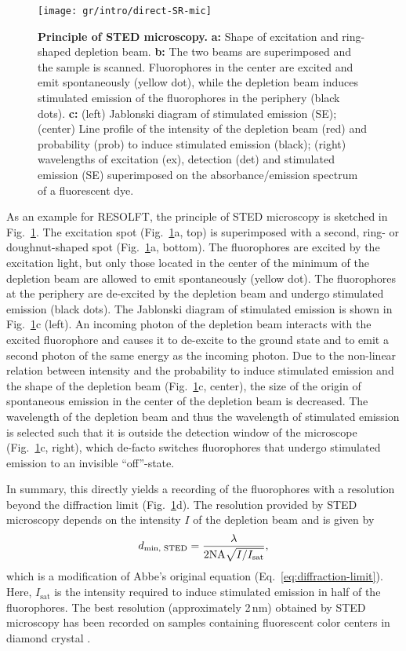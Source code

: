 \begin{figure}
  \centering
  \texttt{[image: gr/intro/direct-SR-mic]}
  \caption{\textbf{Principle of STED microscopy.} \textbf{a:} Shape of
    excitation and ring-shaped depletion beam. \textbf{b:} The two beams are
    superimposed and the sample is scanned. Fluorophores in the center are
    excited and emit spontaneously (yellow dot), while the depletion beam
    induces stimulated emission of the fluorophores in the periphery (black
    dots). \textbf{c:} (left) Jablonski diagram of stimulated emission (SE);
    (center) Line profile of the intensity of the depletion beam (red) and
    probability (prob) to induce stimulated emission (black); (right)
    wavelengths of excitation (ex), detection (det) and stimulated emission
    (SE) superimposed on the absorbance/emission spectrum of a fluorescent
    dye.}
  \label{fig:STED-principle}
\end{figure}

As an example for RESOLFT, the principle of STED microscopy is sketched in
Fig.~\ref{fig:STED-principle}. The excitation spot
(Fig.~\ref{fig:STED-principle}a, top) is superimposed with a second, ring- or
doughnut-shaped spot (Fig.~\ref{fig:STED-principle}a, bottom). The
fluorophores are excited by the excitation light, but only those located in
the center of the minimum of the depletion beam are allowed to emit
spontaneously (yellow dot). The fluorophores at the periphery are de-excited
by the depletion beam and undergo stimulated emission (black dots). The
Jablonski diagram of stimulated emission is shown in
Fig.~\ref{fig:STED-principle}c (left). An incoming photon of the depletion
beam interacts with the excited fluorophore and causes it to de-excite to the
ground state and to emit a second photon of the same energy as the incoming
photon. Due to the non-linear relation between intensity and the probability
to induce stimulated emission and the shape of the depletion beam
(Fig.~\ref{fig:STED-principle}c, center), the size of the origin of
spontaneous emission in the center of the depletion beam is decreased. The
wavelength of the depletion beam and thus the wavelength of stimulated
emission is selected such that it is outside the detection window of the
microscope (Fig.~\ref{fig:STED-principle}c, right), which de-facto switches
fluorophores that undergo stimulated emission to an invisible ``off''-state.

In summary, this directly yields a recording of the fluorophores with a
resolution beyond the diffraction limit (Fig.~\ref{fig:STED-principle}d). The
resolution provided by STED microscopy depends on the intensity $I$ of the
depletion beam and is given by
\begin{equation}
  d_\text{min, STED} = \frac\lambda{2\mathrm{NA}\sqrt{I/I_\text{sat}}}\text,
  \label{eq:resolution-STED}
\end{equation}
which is a modification of Abbe's original equation
(Eq.~\ref{eq:diffraction-limit}). Here, $I_\text{sat}$ is the intensity
required to induce stimulated emission in half of the fluorophores. The best resolution (approximately 2\,nm) obtained by STED microscopy has
been recorded on samples containing fluorescent color centers in diamond
crystal \cite{Wildanger2012}.

